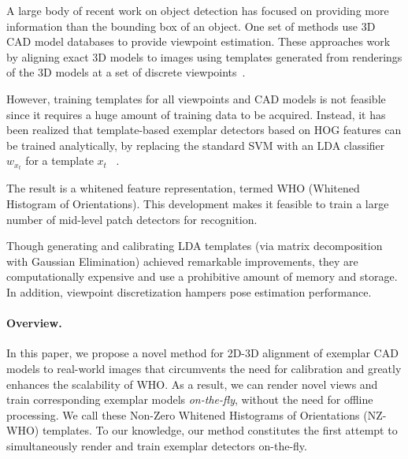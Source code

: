\documentclass[extendedabs]{bmvc2k}
\begin{document}

\noindent
A large body of recent work on object detection has focused on providing more
information than the bounding box of an object. One set of methods use 3D CAD
model databases to provide viewpoint estimation. These approaches work
by aligning exact 3D models to images using templates generated from renderings
of the 3D models at a set of discrete viewpoints~\cite{Aubry14}.

However, training templates for all viewpoints and CAD models is not feasible
since it requires a huge amount of training data to be acquired. Instead, it has been realized that template-based exemplar
detectors based on HOG features can be trained analytically, by
replacing the standard SVM with an LDA classifier $w_{x_t}$ for a template $x_t$
~\cite{Hariharan12}.

The result is a whitened feature representation, termed WHO (Whitened Histogram
of Orientations). This development makes it feasible to train a large number of
mid-level patch detectors for recognition.

Though generating and calibrating LDA templates (via matrix decomposition with
Gaussian Elimination) achieved remarkable improvements, they are
computationally expensive and use a prohibitive amount of memory and storage.
In addition, viewpoint discretization hampers pose estimation performance.



\vspace{-0.15in}
\paragraph{Overview.} In this paper, we propose a novel method for 2D-3D
alignment of exemplar CAD models to real-world images that circumvents the need
for calibration and greatly enhances the scalability of WHO. As a result, we
can render novel views and train corresponding exemplar models {\em
	on-the-fly}, without the need for offline processing. We call these Non-Zero
Whitened Histograms of Orientations (NZ-WHO) templates. To our knowledge, our
method constitutes the first attempt to simultaneously render and train
exemplar detectors on-the-fly.
\end{document}
